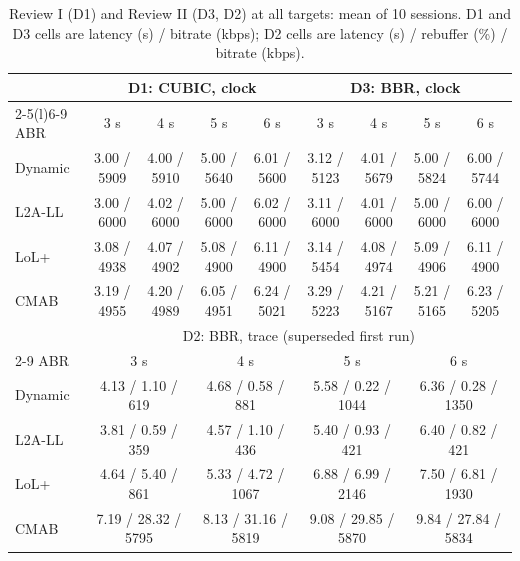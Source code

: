\documentclass[sigconf]{acmart}
\begin{document}
\begin{table}[t]
\caption{Review I (D1) and Review II (D3, D2) at all targets: mean of 10 sessions. D1 and D3 cells are latency (s) / bitrate (kbps); D2 cells are latency (s) / rebuffer (\%) / bitrate (kbps).}
\label{tab:review12full}
\footnotesize
\begin{tabular}{@{}lcccccccc@{}}
\toprule
 & \multicolumn{4}{c}{D1: CUBIC, clock} & \multicolumn{4}{c}{D3: BBR, clock} \\
\cmidrule(lr){2-5}\cmidrule(l){6-9}
ABR & 3 s & 4 s & 5 s & 6 s & 3 s & 4 s & 5 s & 6 s \\
\midrule
Dynamic & 3.00 / 5909 & 4.00 / 5910 & 5.00 / 5640 & 6.01 / 5600 & 3.12 / 5123 & 4.01 / 5679 & 5.00 / 5824 & 6.00 / 5744 \\
L2A-LL  & 3.00 / 6000 & 4.02 / 6000 & 5.00 / 6000 & 6.02 / 6000 & 3.11 / 6000 & 4.01 / 6000 & 5.00 / 6000 & 6.00 / 6000 \\
LoL+    & 3.08 / 4938 & 4.07 / 4902 & 5.08 / 4900 & 6.11 / 4900 & 3.14 / 5454 & 4.08 / 4974 & 5.09 / 4906 & 6.11 / 4900 \\
CMAB    & 3.19 / 4955 & 4.20 / 4989 & 6.05 / 4951 & 6.24 / 5021 & 3.29 / 5223 & 4.21 / 5167 & 5.21 / 5165 & 6.23 / 5205 \\
\midrule
 & \multicolumn{8}{c}{D2: BBR, trace (superseded first run)} \\
\cmidrule(l){2-9}
ABR & \multicolumn{2}{c}{3 s} & \multicolumn{2}{c}{4 s} & \multicolumn{2}{c}{5 s} & \multicolumn{2}{c}{6 s} \\
\midrule
Dynamic & \multicolumn{2}{c}{4.13 / 1.10 / 619} & \multicolumn{2}{c}{4.68 / 0.58 / 881} & \multicolumn{2}{c}{5.58 / 0.22 / 1044} & \multicolumn{2}{c}{6.36 / 0.28 / 1350} \\
L2A-LL  & \multicolumn{2}{c}{3.81 / 0.59 / 359} & \multicolumn{2}{c}{4.57 / 1.10 / 436} & \multicolumn{2}{c}{5.40 / 0.93 / 421} & \multicolumn{2}{c}{6.40 / 0.82 / 421} \\
LoL+    & \multicolumn{2}{c}{4.64 / 5.40 / 861} & \multicolumn{2}{c}{5.33 / 4.72 / 1067} & \multicolumn{2}{c}{6.88 / 6.99 / 2146} & \multicolumn{2}{c}{7.50 / 6.81 / 1930} \\
CMAB    & \multicolumn{2}{c}{7.19 / 28.32 / 5795} & \multicolumn{2}{c}{8.13 / 31.16 / 5819} & \multicolumn{2}{c}{9.08 / 29.85 / 5870} & \multicolumn{2}{c}{9.84 / 27.84 / 5834} \\
\bottomrule
\end{tabular}
\end{table}
\end{document}
